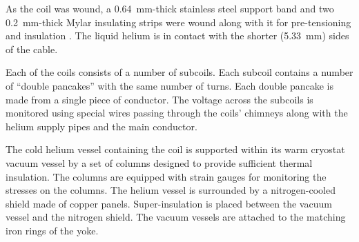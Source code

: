 As the coil was wound, a 0.64~mm-thick stainless steel support band
and two 0.2~mm-thick Mylar insulating strips were wound along with it
for pre-tensioning and insulation%
. 
The liquid helium is in contact with the shorter (5.33~mm) sides of
the cable.

Each of the coils consists of a number of subcoils. Each subcoil
contains a number of ``double pancakes'' with the same number of
turns.
Each double pancake is made from a single piece of conductor. The
voltage across the subcoils is monitored using special wires passing
through the coils' chimneys along with the helium supply pipes and the
main conductor.

The cold helium vessel containing the coil is supported within its
warm cryostat vacuum vessel by a set of columns designed to provide
sufficient thermal insulation. The columns are equipped with strain
gauges for monitoring the stresses on the columns. The helium vessel
is surrounded by a nitrogen-cooled shield made of copper panels.
Super-insulation is placed between the vacuum vessel and the nitrogen
shield.  The vacuum vessels are attached to the matching iron rings of
the yoke.

